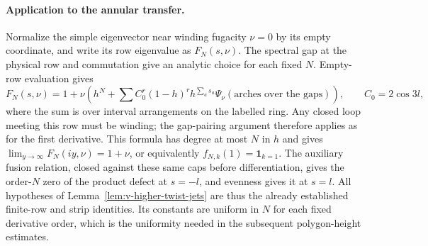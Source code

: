\paragraph{Application to the annular transfer.}
Normalize the simple eigenvector near winding fugacity $\nu=0$ by its
empty coordinate, and write its row eigenvalue as $F_N(s,\nu)$.
The spectral gap at the physical row and commutation give an analytic
choice for each fixed $N$.  Empty-row evaluation gives
\[
 F_N(s,\nu)=1+\nu\left(h^N+
       \sum C_0^r(1-h)^r h^{\sum_a s_a}
                    \Psi_\nu(\text{arches over the gaps})\right),
 \qquad C_0=2\cos3 l,
\]
where the sum is over interval arrangements on the labelled ring.
Any closed loop meeting this row must be winding; the gap-pairing
argument therefore applies as for the first derivative.  This formula
has degree at most $N$ in $h$ and gives
$\lim_{y\to\infty}F_N(iy,\nu)=1+\nu$, or equivalently
$f_{N,k}(1)=\mathbf1_{k=1}$.
The auxiliary fusion relation, closed against these same caps before
differentiation, gives the order-$N$ zero of the product defect at
$s=- l$, and evenness gives it at $s= l$.
All hypotheses of Lemma~\ref{lem:v-higher-twist-jets} are thus the
already established finite-row and strip identities.  Its constants are
uniform in $N$ for each fixed derivative order, which is the uniformity
needed in the subsequent polygon-height estimates.
